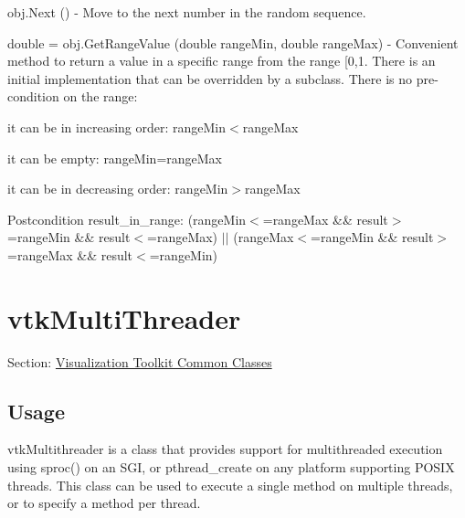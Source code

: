 \begin{DoxyItemize}
\item {\ttfamily obj.\-Next ()} -\/ Move to the next number in the random sequence.  
\item {\ttfamily double = obj.\-Get\-Range\-Value (double range\-Min, double range\-Max)} -\/ Convenient method to return a value in a specific range from the range \mbox{[}0,1. There is an initial implementation that can be overridden by a subclass. There is no pre-\/condition on the range\-:
\begin{DoxyItemize}
\item it can be in increasing order\-: range\-Min$<$range\-Max
\item it can be empty\-: range\-Min=range\-Max
\item it can be in decreasing order\-: range\-Min$>$range\-Max \begin{DoxyPostcond}{Postcondition}
result\-\_\-in\-\_\-range\-: (range\-Min$<$=range\-Max \&\& result$>$=range\-Min \&\& result$<$=range\-Max) $|$$|$ (range\-Max$<$=range\-Min \&\& result$>$=range\-Max \&\& result$<$=range\-Min)  
\end{DoxyPostcond}

\end{DoxyItemize}
\end{DoxyItemize}\hypertarget{vtkcommon_vtkmultithreader}{}\section{vtk\-Multi\-Threader}\label{vtkcommon_vtkmultithreader}
Section\-: \hyperlink{sec_vtkcommon}{Visualization Toolkit Common Classes} \hypertarget{vtkwidgets_vtkxyplotwidget_Usage}{}\subsection{Usage}\label{vtkwidgets_vtkxyplotwidget_Usage}
vtk\-Multithreader is a class that provides support for multithreaded execution using sproc() on an S\-G\-I, or pthread\-\_\-create on any platform supporting P\-O\-S\-I\-X threads. This class can be used to execute a single method on multiple threads, or to specify a method per thread.

